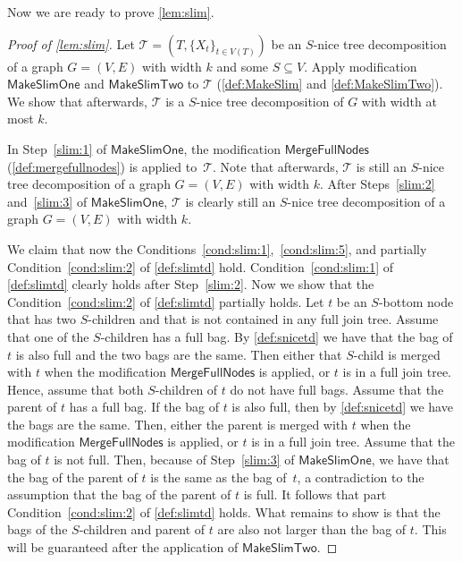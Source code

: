 \documentclass[a4paper,UKenglish,cleveref, autoref, thm-restate, numberwithinsect]{lipics-v2021}
\newcounter{modification}
\newcommand{\slim}{\text{slim}\xspace}
\newcommand{\MergeFullNodes}{\mathsf{MergeFullNodes}}
\newcommand{\MakeSlim}{\mathsf{MakeSlimOne}}
\newcommand{\MakeSlimTwo}{\mathsf{MakeSlimTwo}}
\begin{document}
Now we are ready to prove \cref{lem:slim}.
\begin{proof}[Proof of \cref{lem:slim}]
Let $\mathcal{T}=(T,\{X_t\}_{t\in V(T)})$ be an $S$-nice tree decomposition of a graph $G=(V,E)$ with width $k$ and some $S\subseteq V$. 
Apply modification $\MakeSlim$ and $\MakeSlimTwo$ to $\mathcal{T}$ (\cref{def:MakeSlim} and \cref{def:MakeSlimTwo}). We show that afterwards, $\mathcal{T}$ is a \slim $S$-nice tree decomposition of $G$ with width at most $k$.

In Step~\ref{slim:1} of $\MakeSlim$, the modification $\MergeFullNodes$ (\cref{def:mergefullnodes}) is applied to~$\mathcal{T}$. 
Note that afterwards, $\mathcal{T}$ is still an $S$-nice tree decomposition of a graph $G=(V,E)$ with width $k$.
After Steps~\ref{slim:2} and~\ref{slim:3} of $\MakeSlim$, $\mathcal{T}$ is clearly still an $S$-nice tree decomposition of a graph $G=(V,E)$ with width $k$.

We claim that now the Conditions~\ref{cond:slim:1},~\ref{cond:slim:5}, and partially Condition~\ref{cond:slim:2} of \cref{def:slimtd} hold.
Condition~\ref{cond:slim:1} of \cref{def:slimtd} clearly holds after Step~\ref{slim:2}.
Now we show that the Condition~\ref{cond:slim:2} of \cref{def:slimtd} partially holds. Let $t$ be an $S$-bottom node that has two $S$-children and that is not contained in any full join tree. Assume that one of the $S$-children has a full bag. By \cref{def:snicetd} we have that the bag of $t$ is also full and the two bags are the same. Then either that $S$-child is merged with $t$ when the modification $\MergeFullNodes$ is applied, or $t$ is in a full join tree. Hence, assume that both $S$-children of $t$ do not have full bags. Assume that the parent of $t$ has a full bag. If the bag of $t$ is also full, then by \cref{def:snicetd} we have the bags are the same. Then, either the parent is merged with $t$ when the modification $\MergeFullNodes$ is applied, or $t$ is in a full join tree. Assume that the bag of $t$ is not full. Then, because of Step~\ref{slim:3} of $\MakeSlim$, we have that the bag of the parent of $t$ is the same as the bag of~$t$, a contradiction to the assumption that the bag of the parent of $t$ is full. It follows that part Condition~\ref{cond:slim:2} of \cref{def:slimtd} holds. What remains to show is that the bags of the $S$-children and parent of $t$ are also not larger than the bag of $t$. This will be guaranteed after the application of $\MakeSlimTwo$.


\end{proof}
\end{document}
